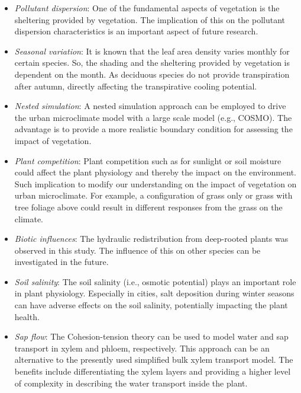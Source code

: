 \begin{itemize}
	\item \textit{Pollutant dispersion}: One of the fundamental aspects of vegetation is the sheltering provided by vegetation. The implication of this on the pollutant dispersion characteristics is an important aspect of future research. 
	
	\item \textit{Seasonal variation}: It is known that the leaf area density varies monthly for certain species. So, the shading and the sheltering provided by vegetation is dependent on the month. As deciduous species do not provide transpiration after autumn, directly affecting the transpirative cooling potential.
	
	\item \textit{Nested simulation}: A nested simulation approach can be employed to drive the urban microclimate model with a large scale model (e.g., COSMO). The advantage is to provide a more realistic boundary condition for assessing the impact of vegetation.

	\item \textit{Plant competition}: Plant competition such as for sunlight or soil moisture could affect the plant physiology and thereby the impact on the environment. Such implication to modify our understanding on the impact of vegetation on urban microclimate. For example, a configuration of grass only or grass with tree foliage above could result in different responses from the grass on the climate.
	
	\item \textit{Biotic influences}: The hydraulic redistribution from deep-rooted plants was observed in this study. The influence of this on other species can be investigated in the future.

	\item \textit{Soil salinity}: The soil salinity (i.e., osmotic potential) plays an important role in plant physiology. Especially in cities, salt deposition during winter seasons can have adverse effects on the soil salinity, potentially impacting the plant health. 
	
	\item \textit{Sap flow}: The Cohesion-tension theory can be used to model water and sap transport in xylem and phloem, respectively. This approach can be an alternative to the presently used simplified bulk xylem transport model. The benefits include differentiating the xylem layers and providing a higher level of complexity in describing the water transport inside the plant.
	

\end{itemize}

